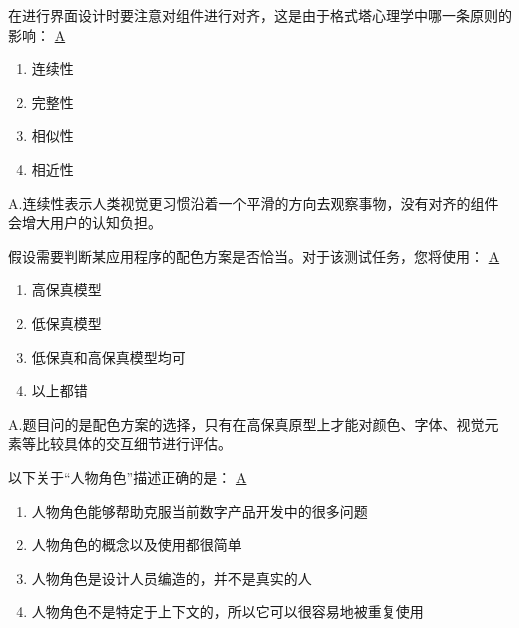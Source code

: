 \begin{problem}
	在进行界面设计时要注意对组件进行对齐，这是由于格式塔心理学中哪一条原则的影响：
	\uline{A}    
    \vspace{-0.8em}
    \begin{multicols}{4}
        \begin{enumerate}[label=\Alph*.]
            \item 连续性
            \item 完整性
            \item 相似性
            \item 相近性
        \end{enumerate}
    \end{multicols}
    \vspace{-1em}
\end{problem}

\begin{solution}
A.连续性表示人类视觉更习惯沿着一个平滑的方向去观察事物，没有对齐的组件会增大用户的认知负担。
\end{solution}


\begin{problem}
	假设需要判断某应用程序的配色方案是否恰当。对于该测试任务，您将使用：
	\uline{A}    
    \vspace{-0.8em}
    \begin{multicols}{2}
        \begin{enumerate}[label=\Alph*.]
            \item 高保真模型
            \item 低保真模型
            \item 低保真和高保真模型均可
            \item 以上都错
        \end{enumerate}
    \end{multicols}
    \vspace{-1em}
\end{problem}

\begin{solution}
A.题目问的是配色方案的选择，只有在高保真原型上才能对颜色、字体、视觉元素等比较具体的交互细节进行评估。
\end{solution}


\begin{problem}
	以下关于“人物角色”描述正确的是：
	\uline{A}    
        \begin{enumerate}[label=\Alph*.]
            \item 人物角色能够帮助克服当前数字产品开发中的很多问题
            \item 人物角色的概念以及使用都很简单
            \item 人物角色是设计人员编造的，并不是真实的人
            \item 人物角色不是特定于上下文的，所以它可以很容易地被重复使用
        \end{enumerate}
\end{problem}

